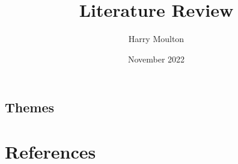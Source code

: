 \documentclass{article}
\title{Literature Review}
\author{Harry Moulton}
\date{November 2022}
\begin{document}
\maketitle
\begin{multicols}{2}



\section{Themes}




\end{multicols}

\pagebreak
\section{References}
\printbibliography
\end{document}
